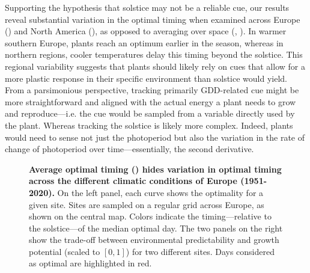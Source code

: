 \documentclass[11pt,letter]{article}
\begin{document}
Supporting the hypothesis that solstice may not be a reliable cue, our results reveal substantial variation in the optimal timing when examined across Europe () and North America (), as opposed to averaging over space (, ). In warmer southern Europe, plants reach an optimum earlier in the season, whereas in northern regions, cooler temperatures delay this timing beyond the solstice. This regional variability suggests that plants should likely rely on cues that allow for a more plastic response in their specific environment than solstice would yield. From a parsimonious perspective, tracking primarily GDD-related cue might be more straightforward and aligned with the actual energy a plant needs to grow and reproduce---i.e. the cue would be sampled from a variable directly used by the plant.
Whereas tracking the solstice is likely more complex. Indeed, plants would need to sense not just the photoperiod but also the variation in the rate of change of photoperiod over time---essentially, the second derivative.

\begin{figure}[h]
	\vspace*{0.3cm}
	\caption{\textbf{Average optimal timing () hides variation in optimal timing across the different climatic conditions of Europe (1951-2020).} On the left panel, each curve shows the optimality for a given site. Sites are sampled on a regular grid across Europe, as shown on the central map. Colors indicate the timing---relative to the solstice---of the median optimal day. The two panels on the right show the trade-off between environmental predictability and growth potential (scaled to $[0,1]$) for two different sites. Days considered as optimal are highlighted in red.}
	\label{fig:localoptimality}
\end{figure}
\end{document}
